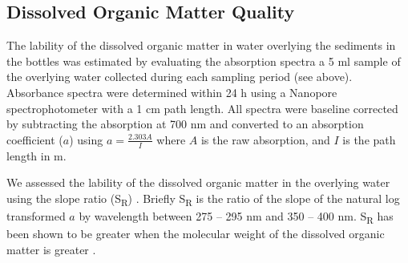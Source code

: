 \subsection{Dissolved Organic Matter Quality}

The lability of the dissolved organic matter in water overlying the sediments in the bottles was estimated by evaluating the absorption spectra a 5 ml sample of the overlying water collected during each sampling period (see above). Absorbance spectra were determined within 24 h using a Nanopore spectrophotometer with a 1 cm path length. All spectra were baseline corrected by subtracting the absorption at 700 nm and converted to an absorption coefficient ($a$) using $a = \frac{2.303A}{I}$ where $A$ is the raw absorption, and $I$ is the path length in m.

We assessed the lability of the dissolved organic matter in the overlying water using the slope ratio (S\textsubscript{R}) \cite{helmsetal2008}. Briefly S\textsubscript{R} is the ratio of the slope of the natural log transformed $a$ by wavelength between 275 -- 295 nm and 350 -- 400 nm. S\textsubscript{R} has been shown to be greater when the molecular weight of the dissolved organic matter is greater \cite{helmsetal2008}. 

  
  